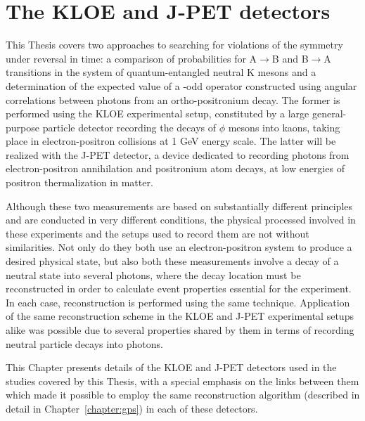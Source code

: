 \chapter{The KLOE and J-PET detectors}
\label{chapter:detectors}

This Thesis covers two approaches to searching for violations of the symmetry under reversal in time: a comparison of probabilities for A$\to$B and B$\to$A transitions in the system of quantum-entangled neutral K mesons and a determination of the expected value of a \Ts-odd operator constructed using angular correlations between photons from an ortho-positronium decay. The former is performed using the KLOE experimental setup, constituted by a large general-purpose particle detector recording the decays of $\phi$ mesons into kaons, taking place in electron-positron collisions at 1 GeV energy scale. The latter will be realized with the J-PET detector, a device dedicated to recording photons from electron-positron annihilation and positronium atom decays, at low energies of positron thermalization in matter.

Although these two measurements are based on substantially different principles and are conducted in very different conditions, the physical processed involved in these experiments and the setups used to record them are not without similarities. Not only do they both use an electron-positron system to produce a desired physical state, but also both these measurements involve a decay of a neutral state into several photons, where the decay location must be reconstructed in order to calculate event properties essential for the experiment. In each case, reconstruction is performed using the same technique. Application of the same reconstruction scheme in the KLOE and J-PET experimental setups alike was possible due to several properties shared by them in terms of recording neutral particle decays into photons.

This Chapter presents details of the KLOE and J-PET detectors used in the studies covered by this Thesis, with a special emphasis on the links between them which made it possible to employ the same reconstruction algorithm (described in detail in Chapter~\ref{chapter:gps}) in each of these detectors.

